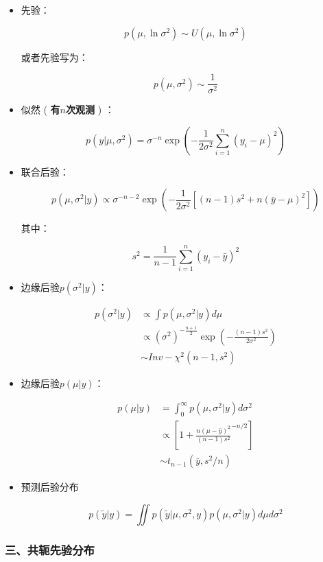 \begin{itemize}
\item
  先验：

  \[p(\mu,\ln\sigma^2)\sim U(\mu,\ln \sigma^2)\]

  或者先验写为：

  \[p(\mu,\sigma^2)\sim\frac{1}{\sigma^2}\]
\item
  似然 ( \textbf{有\(n\)次观测 }) ：

  \[p(y|\mu,\sigma^2)=\sigma^{-n}\exp \left(
  -\frac{1}{2\sigma^2}\sum_{i=1}^{n}(y_i-\mu)^2
  \right)\]
\item
  联合后验：

  \[p(\mu,\sigma^2|y)\propto \sigma^{-n-2}\exp\left(
  -\frac{1}{2\sigma^2}[(n-1)s^2+n(\bar{y}-\mu)^2]
  \right)\]

  其中：

  \[s^2=\frac{1}{n-1}\sum_{i=1}^{n}(y_i-\bar y)^2\]
\item
  边缘后验\(p(\sigma^2|y)\)：

  \begin{align*}
  p(\sigma^2|y)
  &\propto \int p(\mu,\sigma^2|y)d\mu\\
  &\propto(\sigma^2)^{-\frac{n+1}{2}}\exp\left(
  -\frac{(n-1)s^2}{2\sigma^2}
  \right)\\
  &\sim Inv-\chi^2(n-1,s^2)
  \end{align*}
\item
  边缘后验\(p(\mu|y)\)：

  \begin{align*}
  p(\mu|y)
  &=\int_0^{\infty}p(\mu,\sigma^2|y)d\sigma^2\\
  &\propto\left[
  1+\frac{n(\mu-\bar y)^2}{(n-1)s^2}^{-n/2}
  \right] \\
  &\sim t_{n-1}(\bar y,s^2/n)
  \end{align*}
\item
  预测后验分布

  \[p(\widetilde y|y)=\iint  p(\widetilde y |\mu,\sigma^2,y)p(\mu,\sigma^2|y)
  d\mu d\sigma^2\]
\end{itemize}

\hypertarget{ux4e09ux5171ux8f6dux5148ux9a8cux5206ux5e03}{%
\subsubsection{三、共轭先验分布}\label{ux4e09ux5171ux8f6dux5148ux9a8cux5206ux5e03}}

